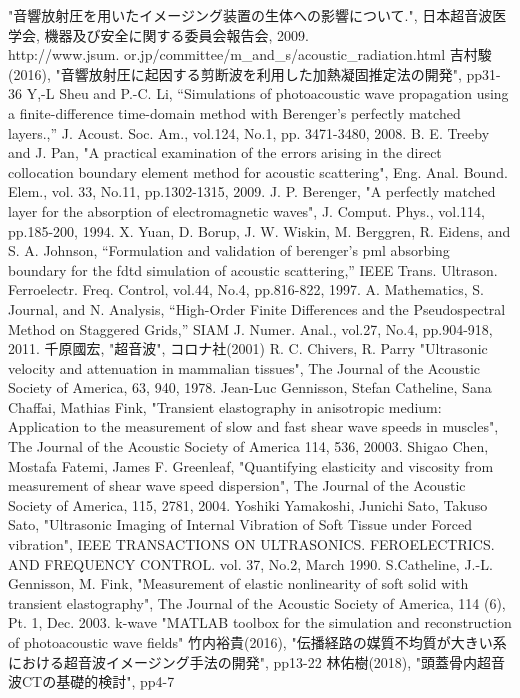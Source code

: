 \begin{thebibliography}{9}
     "音響放射圧を用いたイメージング装置の生体への影響について.", 日本超音波医学会, 機器及び安全に関する委員会報告会, 2009. \\http://www.jsum. or.jp/committee/m\_and\_s/acoustic\_radiation.html
      吉村駿(2016),
     "音響放射圧に起因する剪断波を利用した加熱凝固推定法の開発", pp31-36
      Y,-L Sheu and P.-C. Li,
     “Simulations of photoacoustic wave propagation using a finite-difference time-domain method with Berenger’s perfectly matched layers.,” J. Acoust. Soc. Am., vol.124, No.1, pp. 3471-3480, 2008.
      B. E. Treeby and J. Pan,
      "A practical examination of the errors arising in the direct collocation boundary element method for acoustic scattering", Eng. Anal. Bound. Elem., vol. 33, No.11,  pp.1302-1315, 2009.
      J. P. Berenger,
     "A perfectly matched layer for the absorption of electromagnetic waves", J. Comput. Phys., vol.114, pp.185-200, 1994. 
      X. Yuan, D. Borup, J. W. Wiskin, M. Berggren, R. Eidens, and S. A. Johnson,
“Formulation and validation of berenger’s pml absorbing boundary for the fdtd simulation of acoustic scattering,” IEEE Trans. Ultrason. Ferroelectr. Freq. Control, vol.44, No.4, pp.816-822, 1997.
      A. Mathematics, S. Journal, and N. Analysis,
     “High-Order Finite Differences and the Pseudospectral Method on Staggered Grids,” SIAM J. Numer. Anal., vol.27, No.4, pp.904-918, 2011.
      千原國宏,     
     "超音波", コロナ社(2001)
      R. C. Chivers, R. Parry
     "Ultrasonic velocity and attenuation in mammalian tissues", The Journal of the Acoustic Society of America, 63, 940, 1978.
       Jean-Luc Gennisson, Stefan Catheline, Sana Chaffai, Mathias Fink,
      "Transient elastography in anisotropic medium: Application to the measurement of slow and fast shear wave speeds in muscles", The Journal of the Acoustic Society of America 114, 536, 20003.
       Shigao Chen, Mostafa Fatemi, James F. Greenleaf,
      "Quantifying elasticity and viscosity from measurement of shear wave speed dispersion", The Journal of the Acoustic Society of America, 115, 2781, 2004.
       Yoshiki Yamakoshi, Junichi Sato, Takuso Sato,
      "Ultrasonic Imaging of Internal Vibration of Soft Tissue under Forced vibration", IEEE TRANSACTIONS ON ULTRASONICS. FEROELECTRICS. AND FREQUENCY CONTROL. vol. 37, No.2, March 1990.
       S.Catheline, J.-L. Gennisson, M. Fink,
      "Measurement of elastic nonlinearity of soft solid with transient elastography", The Journal of the Acoustic Society of America, 114 (6), Pt. 1, Dec. 2003.
      k-wave
     "MATLAB toolbox for the simulation and reconstruction of photoacoustic wave fields"
           竹内裕貴(2016),
     "伝播経路の媒質不均質が大きい系における超音波イメージング手法の開発", pp13-22
      林佑樹(2018),
     "頭蓋骨内超音波CTの基礎的検討", pp4-7
\end{thebibliography}